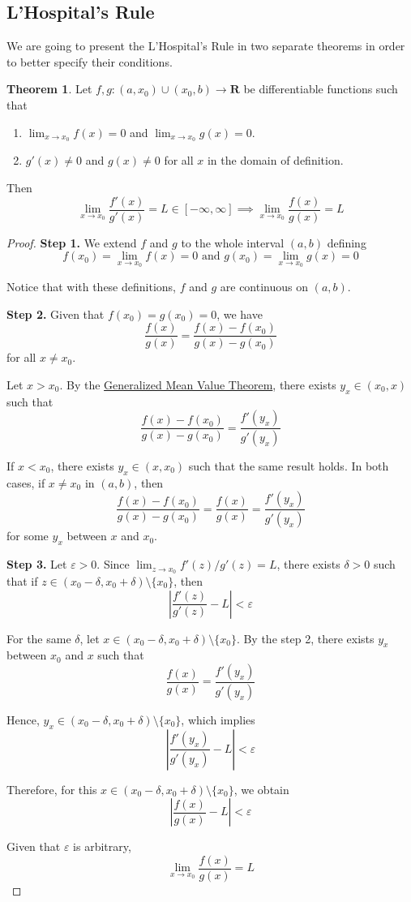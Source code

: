 \documentclass[tikz,12pt,a4paper]{article}
\theoremstyle{definition}
\newtheorem{theorem}{Theorem}[section]
\begin{document}
\subsection{L'Hospital's Rule}

We are going to present the L'Hospital's Rule in two separate theorems in order to better specify their conditions.

\begin{theorem}
	Let $f, g : (a, x_0) \cup (x_0, b) \longrightarrow \textbf{R}$ be differentiable functions such that
	\begin{enumerate}
		\item $\lim_{x \to x_0} f(x) = 0$ and $\lim_{x \to x_0} g(x) = 0$.
		\item $g'(x) \neq 0$ and $g(x) \neq 0$ for all $x$ in the domain of definition.
	\end{enumerate}
	
	Then
	\[
		\lim_{x \to x_0} \frac{f'(x)}{g'(x)} = L \in [- \infty , \infty] \implies \lim_{x \to x_0} \frac{f(x)}{g(x)} = L
	\]
\end{theorem}

\begin{proof}
	\textbf{Step 1.} We extend $f$ and $g$ to the whole interval $(a,b)$ defining
	\[
	    f(x_0) = \lim_{x \to x_0} f(x) = 0 \text{ and } g(x_0) = \lim_{x \to x_0} g(x) = 0
	\]
	
	Notice that with these definitions, $f$ and $g$ are continuous on $(a,b)$.

	\textbf{Step 2.} Given that $f(x_0) = g(x_0) = 0$, we have
	\[
		\frac{f(x)}{g(x)} = \frac{f(x) - f(x_0)}{g(x) - g(x_0)} 
	\]
	for all $x \neq x_0$.

	Let $x > x_0$. By the \hyperref[thm:generalized-mean-value]{Generalized Mean Value Theorem}, there exists $y_x \in (x_0, x)$ such that 
	\[
		\frac{f(x) - f(x_0)}{g(x) - g(x_0)} = \frac{f'(y_x)}{g'(y_x)}
	\]

	If $x < x_0$, there exists $y_x \in (x, x_0)$ such that the same result holds. In both cases, if $x \neq x_0$ in $(a,b)$, then
	\[
		\frac{f(x) - f(x_0)}{g(x) - g(x_0)} = \frac{f(x)}{g(x)} = \frac{f'(y_x)}{g'(y_x)}
	\]
	for some $y_x$ between $x$ and $x_0$.

	\textbf{Step 3.} Let $\varepsilon > 0$. Since $\lim_{z \to x_0} f'(z)/g'(z) = L$, there exists $\delta >0$ such that if $z \in (x_0 - \delta, x_0 + \delta)\setminus \{ x_0 \}$, then
	\[
		\left| \frac{f'(z)}{g'(z)} - L \right| < \varepsilon
	\]

	For the same $\delta$, let $x \in (x_0 - \delta, x_0 + \delta)\setminus \{ x_0 \}$. By the step 2, there exists $y_x$ between $x_0$ and $x$ such that
	\[
		\frac{f(x)}{g(x)} = \frac{f'(y_x)}{g'(y_x)}
	\]

	Hence, $y_x \in (x_0 - \delta, x_0 + \delta)\setminus \{ x_0 \}$, which implies
	\[
		\left| \frac{f'(y_x)}{g'(y_x)} - L \right| < \varepsilon
	\]

	Therefore, for this $x \in (x_0 - \delta, x_0 + \delta)\setminus \{ x_0 \}$, we obtain
	\[
		\left| \frac{f(x)}{g(x)} - L \right| < \varepsilon
	\]

	Given that $\varepsilon$ is arbitrary,
	\[
		\lim_{x \to x_0} \frac{f(x)}{g(x)} = L
	\]
\end{proof}
\end{document}
